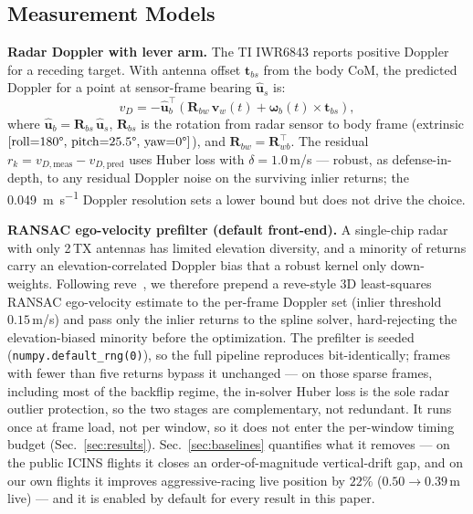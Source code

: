\documentclass[journal]{IEEEtran}
\newcommand{\vR}{\mathbf{R}}
\newcommand{\vv}{\mathbf{v}}
\newcommand{\vom}{\boldsymbol{\omega}}
\newcommand{\vu}{\hat{\mathbf{u}}}
\begin{document}
\subsection{Measurement Models}
\label{sec:models}

\textbf{Radar Doppler with lever arm.}
The TI IWR6843 reports positive Doppler for a receding target.
With antenna offset $\mathbf{t}_{bs}$ from the body CoM, the
predicted Doppler for a point at sensor-frame bearing $\vu_s$ is:
\begin{equation}
  v_D = -\vu_b^{\top}\!\left(
    \vR_{bw}\,\vv_w(t) + \vom_b(t) \times \mathbf{t}_{bs}
  \right),
  \label{eq:doppler}
\end{equation}
where $\vu_b = \vR_{bs}\,\vu_s$, $\vR_{bs}$ is the rotation from
radar sensor to body frame (extrinsic $[\text{roll}{=}180\degree,\,
\text{pitch}{=}25.5\degree,\,\text{yaw}{=}0\degree]$), and
$\vR_{bw} = \vR_{wb}^{\top}$.  The residual
$r_k = v_{D,\text{meas}} - v_{D,\text{pred}}$ uses Huber
loss with $\delta = 1.0$\,m/s --- robust, as defense-in-depth, to any
residual Doppler noise on the surviving inlier returns; the
\SI{0.049}{\metre\per\second} Doppler resolution sets a lower bound but
does not drive the choice.

\textbf{RANSAC ego-velocity prefilter (default front-end).}
A single-chip radar with only 2\,TX antennas has limited elevation
diversity, and a minority of returns carry an elevation-correlated
Doppler bias that a robust kernel only down-weights.  Following
reve~\cite{doer2020ekf}, we therefore prepend a reve-style 3D
least-squares RANSAC ego-velocity estimate to the per-frame Doppler set
(inlier threshold $0.15$\,m/s) and pass only the inlier returns to the
spline solver, hard-rejecting the elevation-biased minority before the
optimization.  The prefilter is seeded
(\texttt{numpy.default\_rng(0)}), so the full pipeline reproduces
bit-identically; frames with fewer than five returns bypass it
unchanged --- on those sparse frames, including most of the backflip
regime, the in-solver Huber loss is the sole radar outlier protection,
so the two stages are complementary, not redundant.  It runs once at
frame load, not per window, so it does not
enter the per-window timing budget (Sec.~\ref{sec:results}).
Sec.~\ref{sec:baselines} quantifies what it removes --- on the public
ICINS flights it closes an order-of-magnitude vertical-drift gap, and on
our own flights it improves aggressive-racing live position by $22\%$ ($0.50\to0.39$\,m
live) --- and it is enabled by default for every result in this paper.
\end{document}
